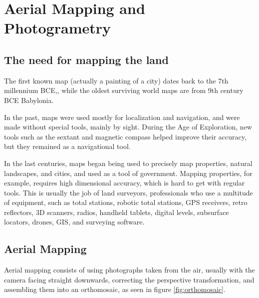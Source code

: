 

\chapter{Aerial Mapping and Photogrametry} \label{chap:AerialMapping}



\section{The need for mapping the land}
The first known map (actually a painting of a city) dates back to the 7th millennium BCE,\cite{map1}, while the oldest surviving world maps are from 9th century BCE Babylonia\cite{map2}.

In the past, maps were used mostly for localization and navigation, and were made without special tools, mainly by sight. During the Age of Exploration, new tools such as the sextant and magnetic compass helped improve their accuracy, but they remained as a navigational tool.

In the last centuries, maps began being used to precisely map properties, natural landscapes, and cities, and used as a tool of government\cite{mapgovernment}. Mapping properties, for example, requires high dimensional accuracy, which is hard to get with regular tools. This is usually the job of land surveyors, professionals who use a multitude of equipment, such as total stations, robotic total stations, GPS receivers, retro reflectors, 3D scanners, radios, handheld tablets, digital levels, subsurface locators, drones, GIS, and surveying software.


\section{Aerial Mapping}
Aerial mapping consists of using photographs taken from the air, usually with the camera facing straight downwards, correcting the perspective transformation, and assembling them into an orthomosaic, as seen in figure \ref{fig:orthomosaic}.

